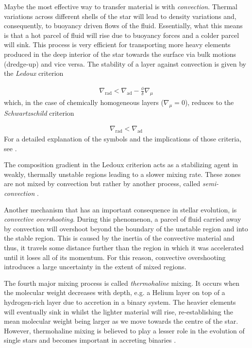 \documentclass[../../main/thesis_msc.tex]{subfiles}
\begin{document}
						Maybe the most effective way to transfer material is with \emph{convection}. Thermal variations across different shells of the star will lead to density variations and, consequently, to buoyancy driven flows of the fluid. Essentially, what this means is that a hot parcel of fluid will rise due to buoyancy forces and a colder parcel will sink. This process is very efficient for transporting more heavy elements produced in the deep interior of the star towards the surface via bulk motions (dredge-up) and vice versa. The stability of a layer against convection is given by the \emph{Ledoux} criterion
						
						\begin{eqnarray}
							\nabla_{\text{rad}} < \nabla_{\text{ad}} - \frac{\phi}{\delta} \nabla_{\mu}
						\end{eqnarray}
						which, in the case of chemically homogeneous layers ($\nabla_{\mu} = 0$), reduces to the \emph{Schwartzschild} criterion
						
						\begin{eqnarray}
							\nabla_{\text{rad}} < \nabla_{\text{ad}}
						\end{eqnarray}
						For a detailed explanation of the symbols and the implications of those criteria, see \cite[pp.~49-51]{Kipp_book}.
						
						The composition gradient in the Ledoux criterion acts as a stabilizing agent in weakly, thermally unstable regions leading to a slower mixing rate. These zones are not mixed by convection but rather by another process, called \emph{semi-convection} \citep[see][]{Spruit2013, Langer1991}.
						
						Another mechanism that has an important consequence in stellar evolution, is \emph{convective overshooting}. During this phenomenon, a parcel of fluid carried away by convection will overshoot beyond the boundary of the unstable region and into the stable region. This is caused by the inertia of the convective material and thus, it travels some distance further than the region in which it was accelerated until it loses all of its momentum. For this reason, convective overshooting introduces a large uncertainty in the extent of mixed regions.
						
						The fourth major mixing process is called \emph{thermohaline} mixing. It occurs when the molecular weight decreases with depth, e.g. a Helium layer on top of a hydrogen-rich layer due to accretion in a binary system. The heavier elements will eventually sink in whilst the lighter material will rise, re-establishing the mean molecular weight being larger as we move towards the centre of the star. However, thermohaline mixing is believed to play a lesser role in the evolution of single stars and becomes important in accreting binaries \citep[see also][]{Cantiello, Charbonnel}.
		
\end{document}
